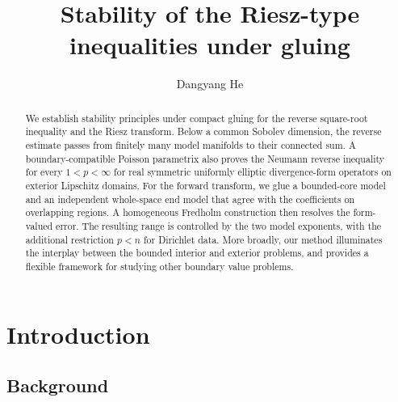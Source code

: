 \documentclass[12pt]{amsart}
\theoremstyle{remark}
\begin{document}
\title{Stability of the Riesz-type inequalities under gluing}
\author{Dangyang He}  
\address{Dangyang He, Department of Mathematics, Sun Yat-sen (Zhongshan) University, Guangzhou, 510275, P.R. China\\
Formerly Department of Mathematics, Macquarie University, Sydney, Australia}






\begin{abstract}
We establish stability principles under compact gluing for the reverse
square-root inequality and the Riesz transform.  Below a common Sobolev
dimension, the reverse estimate passes from finitely many model manifolds
to their connected sum. A boundary-compatible Poisson parametrix also proves the Neumann reverse inequality for every $1<p<\infty$ for real symmetric uniformly elliptic divergence-form operators on exterior Lipschitz domains. For the forward transform, we glue a bounded-core model and an independent whole-space end model that agree with the coefficients on overlapping regions.  A homogeneous Fredholm construction then resolves the form-valued error.  The resulting range is controlled by the two model exponents, with the additional restriction $p<n$ for Dirichlet data. More broadly, our method illuminates the interplay between the bounded interior and exterior problems, and provides a flexible framework for studying other boundary value problems.


\end{abstract}

\maketitle

\hypersetup{linkcolor=red}
\tableofcontents
\hypersetup{linkcolor=red}



\section{Introduction}

\subsection*{Background}
\end{document}

